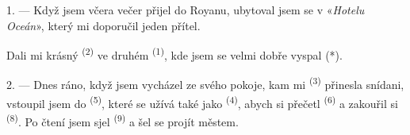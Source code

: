 %
%
%


\VUsaut{3.0mm}
\VUsaut{1.6mm}
\VUsaut{2.0mm}
\VUsaut{3.4mm}

1. --- Když jsem včera večer přijel do Royanu, ubytoval jsem se v «\textit{Hotelu Oceán}»,
který mi doporučil jeden přítel.

Dali mi krásný  \textsuperscript{(2)} ve druhém 
\textsuperscript{(1)}, kde jsem se velmi dobře vyspal (*).

2. --- Dnes ráno, když jsem vycházel ze svého pokoje, kam mi 
\textsuperscript{(3)} přinesla snídani, vstoupil jsem do 
\textsuperscript{(5)}, které se užívá také jako  \textsuperscript{(4)}, abych
si přečetl  \textsuperscript{(6)} a zakouřil si 
\textsuperscript{(8)}. Po čtení jsem sjel
 \textsuperscript{(9)} a šel se projít městem.

